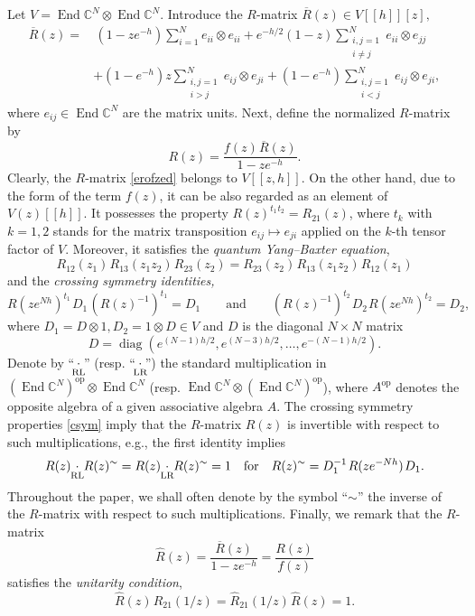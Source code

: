\documentclass[12pt,a4paper,reqno]{amsart}
\theoremstyle{stil}
\theoremstyle{defi}
\theoremstyle{defi}
\theoremstyle{stil}
\theoremstyle{stil}
\theoremstyle{stil}
\theoremstyle{prim}
\newcommand{\wht}{\widehat}
\newcommand{\wvr}{\overline}
\newcommand{\Fand}{\qquad\text{and}\qquad}
\newcommand{\non}{\nonumber}
\newcommand{\beq}{\begin{equation}}
\newcommand{\eeq}{\end{equation}}
\newcommand{\ot}{\otimes}
\newcommand{\ts}{\hspace{1pt}}
\newcommand{\ndo}{\mathop{\mathrm{End}}}
\newcommand{\R}{\wvr{R}}
\newcommand{\CC}{\mathbb{C}}
\newcommand{\cdotrl}{\mathop{\hspace{-2pt}\underset{\text{RL}}{\cdot}\hspace{-2pt}}}
\newcommand{\cdotlr}{\mathop{\hspace{-2pt}\underset{\text{LR}}{\cdot}\hspace{-2pt}}}
\begin{document}
 Let $V=\ndo\CC^N\ot\ndo\CC^N.$ 
Introduce  the    $R$-matrix   $\R (z )\in V  [[ h]][z],$    
\begin{align}
\R (z ) =&\,\left(1-ze^{-h}\right)\sum_{i=1}^N e_{ii}\ot e_{ii} 
+ e^{-h/2}\left(1-z\right)\sum_{\substack{i,j=1\\i\neq j}}^N e_{ii}\ot e_{jj} \non\\
&+  \left(1-e^{-h }\right)z   \sum_{\substack{i,j=1\\i> j}}^N e_{ij}\ot e_{ji}
+  \left(1-e^{-h } \right) \sum_{\substack{i,j=1\\i< j}}^N e_{ij}\ot e_{ji},\label{rbarmatrix}
\end{align}
where $e_{ij}\in\ndo\CC^N$ are the matrix units. 
Next,  define the normalized $R$-matrix by
\beq\label{erofzed}
R(z)=  \frac{f(z)   \ts \R(z)}{1-ze^{-h}}.
\eeq
Clearly, the $R$-matrix \eqref{erofzed} belongs to $V[[z,h]].$ On the other hand, 
due to the form of the term  $f(z)$,  it can be also  regarded as an element  of $V(z)[[h]].$ It possesses the property
$R(z)^{t_1\ts t_2} = R_{21}(z)$,
where $t_k$ with $k=1,2$ stands for the matrix transposition $e_{ij}\mapsto e_{ji}$ applied on the $k$-th tensor factor of $V$. Moreover, it satisfies
the   {\em quantum Yang--Baxter equation},  
\beq\label{trig_ybe_12}
R_{12}(z_1)\ts R_{13}(z_1 z_2)\ts R_{23}(z_2)
 =   R_{23}(z_2)\ts R_{13}(z_1 z_2)\ts R_{12}(z_1) 
\eeq
and the {\em crossing symmetry identities,}
\beq\label{csym}
R(ze^{ Nh})^{t_1} \ts D_1\ts  ( R(z)^{-1})^{t_1}=D_1\Fand (R(z)^{-1})^{t_2} \ts D_2 \ts R(z e^{ Nh})^{t_2} = D_2,
\eeq
where
$D_1=D\ot 1,  D_2=1\ot D \in V$
and $D$ is the diagonal $N\times N$ matrix
\beq\label{diagonal}
D=\mathop{diag}\left(e^{ (N-1)h/2 },e^{ (N-3)h/2},\ldots ,e^{- (N-1)h/2} \right) .
\eeq 
Denote by
``$\cdotrl$'' (resp.  ``$\cdotlr$'')
the standard multiplication in $(\ndo\CC^N)^{\text{op}} \ot\ndo\CC^N$
(resp. $ \ndo\CC^N  \ot(\ndo\CC^N)^{\text{op}}$), where $A^{\text{op}}$ denotes the opposite algebra of a given associative algebra $A$. The crossing symmetry properties \eqref{csym} imply that the $R$-matrix $R(z)$ is invertible with respect to such multiplications, e.g.,   the first identity implies
$$
R(z) \cdotrl R(z)^\sim = R(z) \cdotlr R(z)^\sim =1\quad\text{for}\quad R(z)^\sim = 
D_1^{-1}\ts R(ze^{-Nh})\ts D_1.
$$
Throughout the paper, we shall often denote by the symbol ``$\sim$''   the inverse of the $R$-matrix  with respect to such multiplications.
Finally, we remark that the $R$-matrix
$$
\wht{R}(z)=\frac{ \R(z)}{1-ze^{-h}} = \frac{R(z)}{f(z)} 
$$
satisfies the {\em unitarity condition},
$$
\wht{R}(z)\ts \wht{R}_{21}(1/z) =\wht{R}_{21}(1/z)\ts \wht{R}(z)=1.
$$
\end{document}
